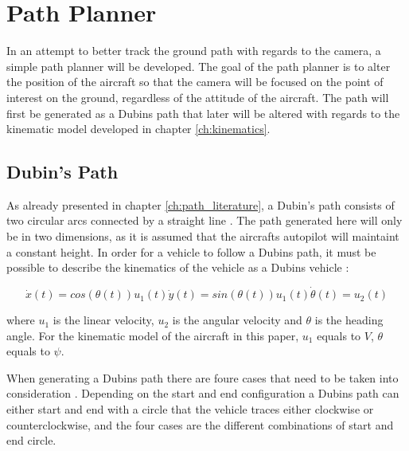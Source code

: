 \section{Path Planner}

In an attempt to better track the ground path with regards to the camera, a simple path planner will be developed. The goal of the path planner is to alter the position of the aircraft so that the camera will be focused on the point of interest on the ground, regardless of the attitude of the aircraft. The path will first be generated as a Dubins path that later will be altered with regards to the kinematic model developed in chapter \ref{ch:kinematics}.


\subsection{Dubin's Path}

As already presented in chapter \ref{ch:path_literature}, a Dubin's path consists of two circular arcs connected by a straight line \cite{DUBIN}. The path generated here will only be in two dimensions, as it is assumed that the aircrafts autopilot will maintaint a constant height. In order for a vehicle to follow a Dubins path, it must be possible to describe the kinematics of the vehicle as a Dubins vehicle \cite{dubinYONG}:

\begin{subequations}
\begin{equation}
	\dot{x}(t) = cos(\theta(t))u_1(t)
\end{equation}
\begin{equation}
	\dot{y}(t) = sin(\theta(t))u_1(t)
\end{equation}
\begin{equation}
	\dot{\theta}(t) = u_2(t)
\end{equation}
\end{subequations}

where $u_1$ is the linear velocity, $u_2$ is the angular velocity and $\theta$ is the heading angle. For the kinematic model of the aircraft in this paper, $u_1$ equals to $V$, $\theta$ equals to $\psi$.

When generating a Dubins path there are foure cases that need to be taken into consideration \cite{suaBEARD}. Depending on the start and end configuration a Dubins path can either start and end with a circle that the vehicle traces either clockwise or counterclockwise, and the four cases are the different combinations of start and end circle.


